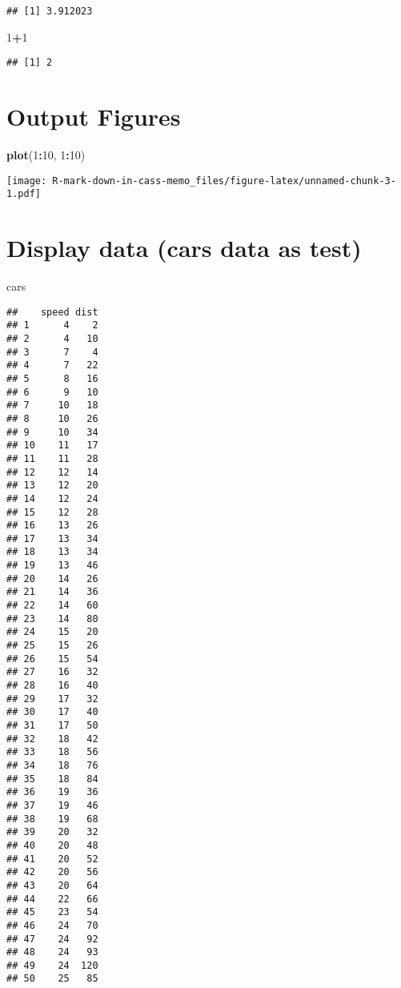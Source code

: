 \documentclass[
]{article}
\newenvironment{Shaded}{\begin{snugshade}}{\end{snugshade}}
\newcommand{\DecValTok}[1]{\textcolor[rgb]{0.00,0.00,0.81}{#1}}
\newcommand{\FunctionTok}[1]{\textcolor[rgb]{0.13,0.29,0.53}{\textbf{#1}}}
\newcommand{\NormalTok}[1]{#1}
\newcommand{\SpecialCharTok}[1]{\textcolor[rgb]{0.81,0.36,0.00}{\textbf{#1}}}
\begin{document}
\begin{verbatim}
## [1] 3.912023
\end{verbatim}

\begin{Shaded}
\begin{Highlighting}[]
\DecValTok{1}\SpecialCharTok{+}\DecValTok{1}
\end{Highlighting}
\end{Shaded}

\begin{verbatim}
## [1] 2
\end{verbatim}

\hypertarget{output-figures}{%
\section{Output Figures}\label{output-figures}}

\begin{Shaded}
\begin{Highlighting}[]
\FunctionTok{plot}\NormalTok{(}\DecValTok{1}\SpecialCharTok{:}\DecValTok{10}\NormalTok{, }\DecValTok{1}\SpecialCharTok{:}\DecValTok{10}\NormalTok{)}
\end{Highlighting}
\end{Shaded}

\texttt{[image: R-mark-down-in-cass-memo\_files/figure-latex/unnamed-chunk-3-1.pdf]}

\hypertarget{display-data-cars-data-as-test}{%
\section{Display data (cars data as
test)}\label{display-data-cars-data-as-test}}

\begin{Shaded}
\begin{Highlighting}[]
\NormalTok{cars}
\end{Highlighting}
\end{Shaded}

\begin{verbatim}
##    speed dist
## 1      4    2
## 2      4   10
## 3      7    4
## 4      7   22
## 5      8   16
## 6      9   10
## 7     10   18
## 8     10   26
## 9     10   34
## 10    11   17
## 11    11   28
## 12    12   14
## 13    12   20
## 14    12   24
## 15    12   28
## 16    13   26
## 17    13   34
## 18    13   34
## 19    13   46
## 20    14   26
## 21    14   36
## 22    14   60
## 23    14   80
## 24    15   20
## 25    15   26
## 26    15   54
## 27    16   32
## 28    16   40
## 29    17   32
## 30    17   40
## 31    17   50
## 32    18   42
## 33    18   56
## 34    18   76
## 35    18   84
## 36    19   36
## 37    19   46
## 38    19   68
## 39    20   32
## 40    20   48
## 41    20   52
## 42    20   56
## 43    20   64
## 44    22   66
## 45    23   54
## 46    24   70
## 47    24   92
## 48    24   93
## 49    24  120
## 50    25   85
\end{verbatim}
\end{document}
